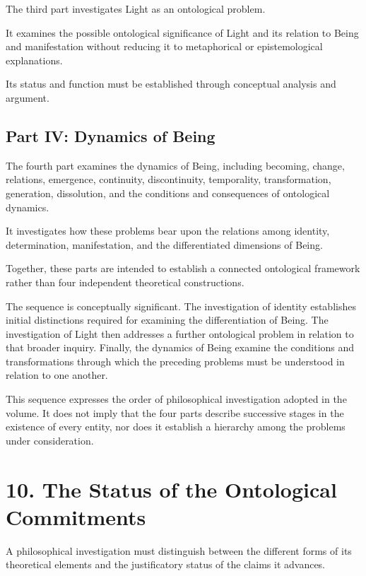 The third part investigates Light as an ontological
problem.

It examines the possible ontological significance
of Light and its relation to Being and manifestation
without reducing it to metaphorical or
epistemological explanations.

Its status and function must be established
through conceptual analysis and argument.

\subsection*{Part IV: Dynamics of Being}

The fourth part examines the dynamics of Being,
including becoming, change, relations, emergence,
continuity, discontinuity, temporality,
transformation, generation, dissolution, and
the conditions and consequences of ontological
dynamics.

It investigates how these problems bear upon
the relations among identity, determination,
manifestation, and the differentiated dimensions
of Being.

Together, these parts are intended to establish
a connected ontological framework rather than
four independent theoretical constructions.

The sequence is conceptually significant.
The investigation of identity establishes initial
distinctions required for examining the differentiation
of Being. The investigation of Light then addresses
a further ontological problem in relation to
that broader inquiry. Finally, the dynamics of
Being examine the conditions and transformations
through which the preceding problems must be
understood in relation to one another.

This sequence expresses the order of philosophical
investigation adopted in the volume. It does not
imply that the four parts describe successive
stages in the existence of every entity, nor does
it establish a hierarchy among the problems
under consideration.


\section*{10. The Status of the Ontological Commitments}

A philosophical investigation must distinguish
between the different forms of its theoretical
elements and the justificatory status of the claims
it advances.

